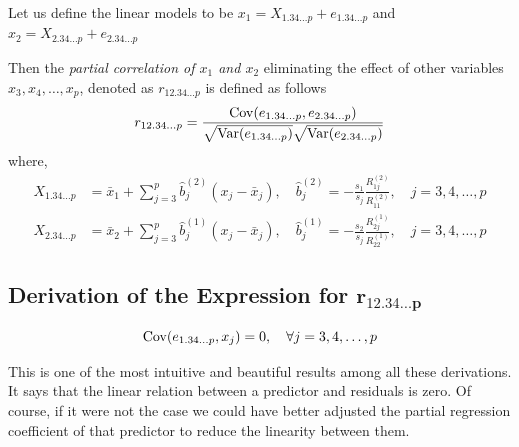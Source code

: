 \documentclass[10pt]{article}
\begin{document}
\begin{definition}
Let us define the linear models to be \( x_{1} = X_{1.34\dots p} + e_{1.34\dots p} \) and \( x_{2} = X_{2.34\dots p} + e_{2.34\dots p}\) 

Then the \emph{partial correlation of \( x_{1} \) and \( x_{2} \)} eliminating the effect of other variables \( x_{3}, x_{4}, \dots, x_{p} \), denoted as \( r_{12.34\dots p} \) is defined as follows
\begin{equation}
	r_{12.34\dots p} = \frac{\operatorname{Cov}(e_{1.34\dots p}, e_{2.34\dots p})}{\sqrt{\operatorname{Var}(e_{1.34\dots p})}\sqrt{\operatorname{Var}(e_{2.34\dots p})}}
\end{equation}
where,
\begin{align*}
	X_{1.34\dots p} &= \bar{x}_{1} + \sum_{j=3}^{p} \hat{b}_{j}^{(2)}( x_{j} - \bar{x}_{j} ), \quad \hat{b}_{j}^{(2)} = -\frac{s _{1}}{s _{j}} \frac{R_{1j}^{(2)}}{R_{11}^{(2)}}, \quad j = 3, 4, \dots, p \\
	X_{2.34\dots p} &= \bar{x}_{2} + \sum_{j=3}^{p} \hat{b}_{j}^{(1)}( x_{j} - \bar{x}_{j} ), \quad \hat{b}_{j}^{(1)} = -\frac{s _{2}}{s _{j}} \frac{R_{2j}^{(1)}}{R_{22}^{(1)}}, \quad j = 3, 4, \dots, p 
\end{align*}
\end{definition}


\subsection{Derivation of the Expression for \( \mathbf{r_{12.34\dots p}} \)}

\begin{lemma}
\begin{equation}
	\operatorname{Cov}(e_{1.34\dots p}, x_j) = 0, \quad \forall j = 3, 4, \dots, p \label{pred_indep_error} 
\end{equation}
\end{lemma}

This is one of the most intuitive and beautiful results among all these derivations. 
It says that the linear relation between a predictor and residuals is zero. 
Of course, if it were not the case we could have better adjusted the partial regression coefficient of that predictor to reduce the linearity between them.
\end{document}
